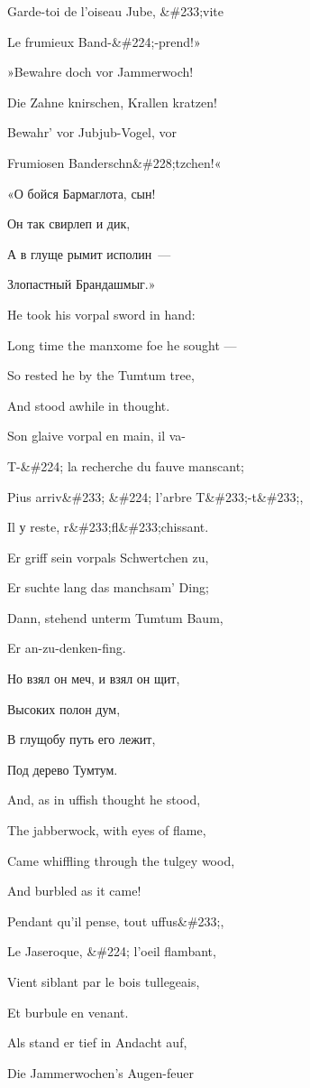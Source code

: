 Garde-toi de l'oiseau Jube, \&\#233;vite

Le frumieux Band-\&\#224;-prend!»

»Bewahre doch vor Jammerwoch!

Die Zahne knirschen, Krallen kratzen!

Bewahr' vor Jubjub-Vogel, vor

Frumiosen Banderschn\&\#228;tzchen!«

«О бойся Бармаглота, сын!

Он так свирлеп и дик,

А в глуще рымит исполин~---

Злопастный Брандашмыг.»

He took his vorpal sword in hand:

Long time the manxome foe he sought ---

So rested he by the Tumtum tree,

And stood awhile in thought.

Son glaive vorpal en main, il va-

T-\&\#224; la recherche du fauve manscant;

Pius arriv\&\#233; \&\#224; l'arbre T\&\#233;-t\&\#233;,

Il у reste, r\&\#233;fl\&\#233;chissant.

Er griff sein vorpals Schwertchen zu,

Er suchte lang das manchsam' Ding;

Dann, stehend unterm Tumtum Baum,

Er an-zu-denken-fing.

Но взял он меч, и взял он щит,

Высоких полон дум,

В глущобу путь его лежит,

Под дерево Тумтум.

And, as in uffish thought he stood,

The jabberwock, with eyes of flame,

Came whiffling through the tulgey wood,

And burbled as it came!

Pendant qu'il pense, tout uffus\&\#233;,

Le Jaseroque, \&\#224; l'oeil flambant,

Vient siblant par le bois tullegeais,

Et burbule en venant.

Als stand er tief in Andacht auf,

Die Jammerwochen's Augen-feuer


